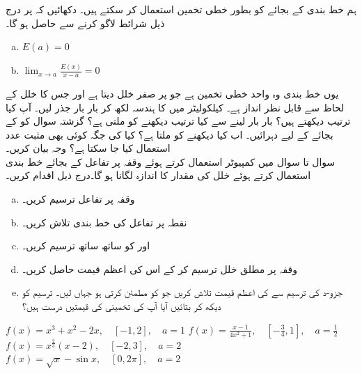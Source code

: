  ہم خط بندی  کے بجائے  کو بطور خطی تخمین استعمال کر سکتے ہیں۔ دکھائیں کہ   پر درج ذیل شرائط لاگو کرنے سے  حاصل ہو گا۔
\begin{enumerate}[a.]
\item
$E(a)=0$\quad\quad  {}
\item
$\lim_{x\to a}\frac{E(x)}{x-a}=0$ \quad \quad {}
\end{enumerate}
یوں خط بندی  وہ واحد خطی تخمین ہے جو  پر صفر خلل دیتا ہے اور جس کا خلل کے لحاظ سے قابل نظر انداز ہے۔
کیلکولیٹر میں  کا ہندسہ لکھ کر بار بار جذر لیں۔ آپ کیا ترتیب دیکھتے ہیں؟ بار بار  لینے سے کیا ترتیب دیکھنے کو ملتی ہے؟
گزشتہ سوال کو  کے بجائے  کے لیے دہرائیں۔ اب کیا دیکھنے کو ملتا ہے؟ کیا  کی جگہ کوئی بھی مثبت عدد  استعمال کیا جا سکتا ہے؟ وجہ بیان کریں۔
\\
سوال  تا سوال  میں کمپیوٹر استعمال کرتے ہوئے وقفہ  پر  تفاعل کے بجائے خط بندی استعمال کرتے ہوئے خلل کی مقدار کا اندازہ لگانا ہو گا۔درج ذیل اقدام کریں۔
\begin{enumerate}[a.]
\item
وقفہ  پر تفاعل  ترسیم کریں۔
\item
نقطہ  پر تفاعل کی خط بندی  تلاش کریں۔
\item
{} اور  کو ساتھ ساتھ ترسیم کریں۔
\item
وقفہ  پر مطلق خلل  ترسیم کر کے اس کی اعظم قیمت حاصل کریں۔
\item
جزو-د کی ترسیم سے  کی اعظم قیمت تلاش کریں جو  کو مطمئن کرتی ہو جہاں   لیں۔ ترسیم کو دیکھ کر بتائیں آیا آپ کی تخمینی   کی قیمتیں درست ہیں؟ 
\end{enumerate} 

$f(x)=x^3+x^2-2x,\quad [-1,2],\quad a=1$
$f(x)=\frac{x-1}{4x^2+1},\quad [-\frac{3}{4},1],\quad a=\frac{1}{2}$
$f(x)=x^{\tfrac{2}{3}}(x-2),\quad [-2,3],\quad a=2$
$f(x)=\sqrt{x}-\sin x,\quad [0,2\pi],\quad a=2$




